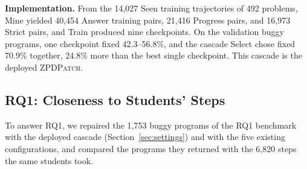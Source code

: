 \documentclass[conference]{IEEEtran}
\begin{document}
\noindent\textbf{Implementation.} From the 14,027 Seen training trajectories of 492 problems, Mine yielded 40,454 Answer training pairs, 21,416 Progress pairs, and 16,973 Strict pairs, and Train produced nine checkpoints. On the validation buggy programs, one checkpoint fixed 42.3--56.8\%, and the cascade Select chose fixed 70.9\% together, 24.8\% more than the best single checkpoint. This cascade is the deployed \textsc{ZPDPatch}.

\subsection{RQ1: Closeness to Students' Steps}
\label{sec:rq-effectiveness}

To answer RQ1, we repaired the 1,753 buggy programs of the RQ1 benchmark with the deployed cascade (Section~\ref{sec:settings}) and with the five existing configurations, and compared the programs they returned with the 6,820 steps the same students took.
\end{document}
